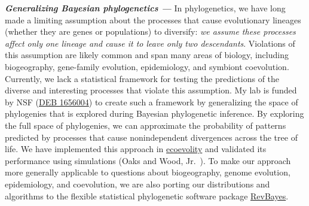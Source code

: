 \textit{\textbf{Generalizing Bayesian phylogenetics ---}}
In phylogenetics, we have long made a limiting assumption about the processes
that cause evolutionary lineages (whether they are genes or populations) to
diversify: \textit{we assume these processes affect only one lineage and cause
    it to leave only two descendants}.
Violations of this assumption are likely common and span many areas of biology,
including biogeography, gene-family evolution, epidemiology, and symbiont
coevolution.
Currently, we lack a statistical framework for testing the predictions of the
diverse and interesting processes that violate this assumption.
My lab is funded by NSF
(\href{https://www.nsf.gov/awardsearch/showAward?AWD_ID=1656004&HistoricalAwards=false}{DEB 1656004})
to create such a framework by generalizing the space of phylogenies that is
explored during Bayesian phylogenetic inference.
By exploring the full space of phylogenies, we can approximate the probability
of patterns predicted by processes that cause nonindependent divergences 
across the tree of life.
We have implemented this approach in 
\href{http://phyletica.org/ecoevolity/}{ecoevolity}
and validated its performance using simulations
(Oaks and Wood, Jr.\ \citeyear{Oaks2021phycoeval}).
%
To make our approach more generally applicable to questions about biogeography,
genome evolution, epidemiology, and coevolution,
we are also porting our distributions and algorithms to the flexible
statistical phylogenetic software package
\href{https://revbayes.github.io/}{RevBayes}.


